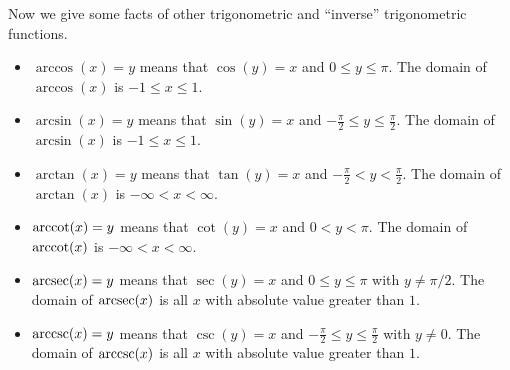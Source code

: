 \documentclass{ximera}
\begin{document}
\begin{example}
\begin{explanation}
%                    
  \end{explanation}
\end{example}



Now we give some facts of other trigonometric and ``inverse''
trigonometric functions.

\begin{definition}\hfil
  \begin{itemize}
    \item $\arccos(x) = y$ means that $\cos(y) = x$ and
      $0\le y\le \pi$. The domain of $\arccos(x)$ is $-1\le x\le
      1$.
    \item $\arcsin(x) = y$ means that $\sin(y) = x$ and
      $-\frac{\pi}{2}\le y\le \frac{\pi}{2}$. The domain of
      $\arcsin(x)$ is $-1\le x\le 1$.
    \item $\arctan(x) = y$ means that $\tan(y) = x$ and
      $-\frac{\pi}{2}< y< \frac{\pi}{2}$. The domain of
      $\arctan(x)$ is $-\infty<x<\infty$.
    \item $\operatorname{arccot}(x) =y$ means that $\cot(y) = x$ and
      $0< y< \pi$. The domain of $\operatorname{arccot}(x)$ is
      $-\infty<x<\infty$.
    \item $\operatorname{arcsec}(x) = y$ means that $\sec(y) = x$ and
      $0\le y\le \pi$ with $y\ne \pi/2$. The domain of
      $\operatorname{arcsec}(x)$ is all $x$ with absolute value greater than $1$.
    \item $\operatorname{arccsc}(x) = y$ means that $\csc(y) = x$ and
      $-\frac{\pi}{2}\le y\le \frac{\pi}{2}$ with $y \ne 0$. The
      domain of $\operatorname{arccsc}(x)$ is all $x$ with absolute value greater
      than $1$.
  \end{itemize}
\end{definition}
\end{document}
